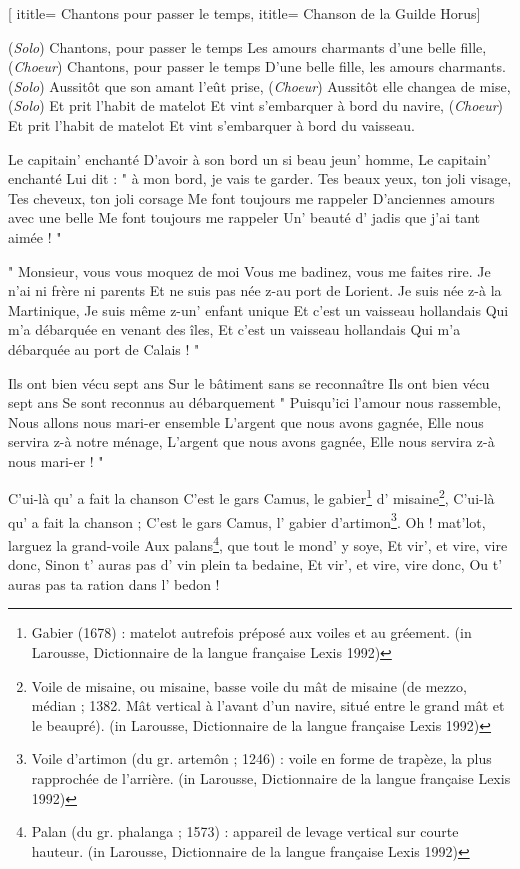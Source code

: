  [
ititle= {Chantons pour passer le temps},
ititle= {Chanson de la Guilde Horus}]


\beginverse 
(\textit {Solo})	Chantons, pour passer le temps
		Les amours charmants d'une belle fille,
(\textit {Choeur}) 	Chantons, pour passer le temps
		D'une belle fille, les amours charmants.
(\textit {Solo}) 	Aussitôt que son amant l'eût prise,
(\textit {Choeur}) 	Aussitôt elle changea de mise,
(\textit {Solo})	Et prit l'habit de matelot
		Et vint s'embarquer à bord du navire,
(\textit {Choeur}) 	Et prit l'habit de matelot
		Et vint s'embarquer à bord du vaisseau.
\endverse

\beginverse
Le capitain' enchanté
D'avoir à son bord un si beau jeun' homme,
Le capitain' enchanté
Lui dit : " à mon bord, je vais te garder.
Tes beaux yeux, ton joli visage,
Tes cheveux, ton joli corsage
Me font toujours me rappeler
D'anciennes amours avec une belle
Me font toujours me rappeler
Un' beauté d' jadis que j'ai tant aimée ! "
\endverse

\beginverse
" Monsieur, vous vous moquez de moi
Vous me badinez, vous me faites rire.
Je n'ai ni frère ni parents
Et ne suis pas née z-au port de Lorient.
Je suis née z-à la Martinique,
Je suis même z-un' enfant unique
Et c'est un vaisseau hollandais
Qui m'a débarquée en venant des îles,
Et c'est un vaisseau hollandais
Qui m'a débarquée au port de Calais ! "
\endverse

\beginverse
Ils ont bien vécu sept ans
Sur le bâtiment sans se reconnaître
Ils ont bien vécu sept ans
Se sont reconnus au débarquement
" Puisqu'ici l'amour nous rassemble,
Nous allons nous mari-er ensemble
L'argent que nous avons gagnée,
Elle nous servira z-à notre ménage,
L'argent que nous avons gagnée,
Elle nous servira z-à nous mari-er ! "
\endverse

\beginverse
C'ui-là qu' a fait la chanson
C'est le gars Camus, le gabier\footnote {Gabier (1678) : matelot autrefois préposé aux voiles et au gréement. (in Larousse, Dictionnaire de la langue française Lexis 1992)} d' misaine\footnote {Voile de misaine, ou misaine, basse voile du mât de misaine (de mezzo, médian ; 1382. Mât vertical à l'avant d'un navire, situé entre le grand mât et le beaupré). (in Larousse, Dictionnaire de la langue française Lexis 1992)},
C'ui-là qu' a fait la chanson ;
C'est le gars Camus, l' gabier d'artimon\footnote {Voile d'artimon (du gr. artemôn ; 1246) : voile en forme de trapèze, la plus rapprochée de l'arrière. (in Larousse, Dictionnaire de la langue française Lexis 1992)}.
Oh ! mat'lot, larguez la grand-voile
Aux palans\footnote {Palan (du gr. phalanga ; 1573) : appareil de levage vertical sur courte hauteur. (in Larousse, Dictionnaire de la langue française Lexis 1992)}, que tout le mond' y soye,
Et vir', et vire, vire donc,
Sinon t' auras pas d' vin plein ta bedaine,
Et vir', et vire, vire donc,
Ou t' auras pas ta ration dans l' bedon !
\endverse

\endsong